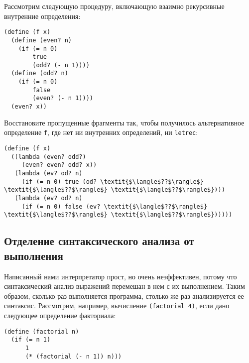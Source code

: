 \begin{exercise}{4.21}
\begin{plainenum}
\item
Рассмотрим следующую процедуру, включающую
взаимно рекурсивные внутренние определения:

\begin{Verbatim}[fontsize=\small]
(define (f x)
  (define (even? n)
    (if (= n 0)
        true
        (odd? (- n 1))))
  (define (odd? n)
    (if (= n 0)
        false
        (even? (- n 1))))
  (even? x))
\end{Verbatim}
Восстановите пропущенные фрагменты так, чтобы получилось альтернативное
определение {\tt f}, где нет ни внутренних определений,
ни {\tt letrec}:

\begin{Verbatim}[fontsize=\small]
(define (f x)
  ((lambda (even? odd?)
     (even? even? odd? x))
   (lambda (ev? od? n)
     (if (= n 0) true (od? \textit{$\langle$??$\rangle$} \textit{$\langle$??$\rangle$} \textit{$\langle$??$\rangle$})))
   (lambda (ev? od? n)
     (if (= n 0) false (ev? \textit{$\langle$??$\rangle$} \textit{$\langle$??$\rangle$} \textit{$\langle$??$\rangle$})))))
\end{Verbatim}
\end{plainenum}
\end{exercise}

\subsection{Отделение синтаксического анализа от выполнения}
\label{SEPARATING-SYNTACTIC-ANALYSIS-FRON-EXECUTION}%


Написанный нами интерпретатор прост, но 
очень неэффективен,
потому что синтаксический анализ выражений перемешан в нем с их
выполнением.  Таким образом, сколько раз выполняется программа,
столько же раз анализируется ее синтаксис.  Рассмотрим, например,
вычисление {\tt (factorial 4)}, если дано следующее определение
факториала:

\begin{Verbatim}[fontsize=\small]
(define (factorial n)
  (if (= n 1)
      1
      (* (factorial (- n 1)) n)))
\end{Verbatim}

